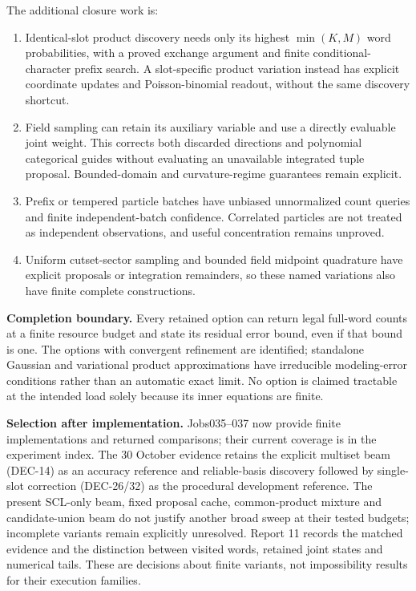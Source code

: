 \documentclass[10pt,a4paper]{article}
\begin{document}
The additional closure work is:
\begin{enumerate}
\item Identical-slot product discovery needs only its highest $\min(K,M)$ word probabilities, with a proved
      exchange argument and finite conditional-character prefix search. A slot-specific product variation
      instead has explicit coordinate updates and Poisson-binomial readout, without the same discovery shortcut.
\item Field sampling can retain its auxiliary variable and use a directly evaluable joint weight.
      This corrects both discarded directions and polynomial categorical guides without evaluating
      an unavailable integrated tuple proposal. Bounded-domain and curvature-regime guarantees remain explicit.
\item Prefix or tempered particle batches have unbiased unnormalized count queries and finite
      independent-batch confidence. Correlated particles are not treated as independent observations,
      and useful concentration remains unproved.
\item Uniform cutset-sector sampling and bounded field midpoint quadrature have explicit proposals or
      integration remainders, so these named variations also have finite complete constructions.
\end{enumerate}

\textbf{Completion boundary.} Every retained option can return legal full-word counts at a finite
resource budget and state its residual error bound, even if that bound is one. The options with
convergent refinement are identified; standalone Gaussian and variational product approximations have
irreducible modeling-error conditions rather than an automatic exact limit.
No option is claimed tractable at the intended load solely because its inner equations are finite.

\textbf{Selection after implementation.} Jobs035--037 now provide finite implementations and returned
comparisons; their current coverage is in the experiment index. The 30 October evidence retains the
explicit multiset beam (DEC-14) as an accuracy reference and reliable-basis discovery followed by
single-slot correction (DEC-26/32) as the procedural development reference. The present SCL-only beam,
fixed proposal cache, common-product mixture and candidate-union beam do not justify another broad
sweep at their tested budgets; incomplete variants remain explicitly unresolved. Report 11 records the
matched evidence and the distinction between visited words, retained joint states and numerical tails.
These are decisions about finite variants, not impossibility results for their execution families.
\end{document}
